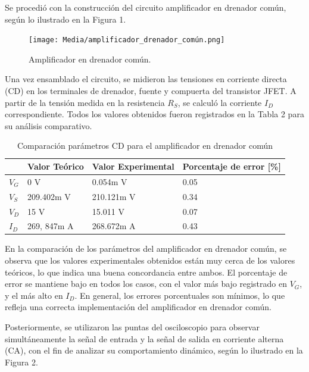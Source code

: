 \documentclass[journal]{IEEEtran}
\begin{document}
	\par Se procedió con la construcción del circuito amplificador en drenador común, según lo ilustrado en la Figura 1. 
	\begin{figure}[H]
		\centering
		\texttt{[image: Media/amplificador\_drenador\_común.png]}
		\caption{Amplificador en drenador común.}
		\label{fig:amplificador_drenador_común.}
	\end{figure}
	\par Una vez ensamblado el circuito, se midieron las tensiones en corriente directa (CD) en los terminales de drenador, fuente y compuerta del transistor JFET. A partir de la tensión medida en la resistencia \( R_S \), se calculó la corriente \( I_D \) correspondiente. Todos los valores obtenidos fueron registrados en la Tabla 2 para su análisis comparativo.
	\begin{table}[h]
		\caption{Comparación parámetros CD para el amplificador en drenador común}
		\centering
		\renewcommand{\arraystretch}{1.2} %
		\begin{tabular}{|l|p{2cm}|p{2cm}|p{2cm}|}
			\hline
			& \textbf{Valor Teórico} & \textbf{Valor Experimental} & \textbf{Porcentaje de error [\%]} \\
			\hline
			\( V_G \) & 0 V  & 0.054m V  & 0.05 \\
			\hline
			\( V_S \) & 209.402m V   & 210.121m V  & 0.34 \\
			\hline
			\( V_D \) & 15 V & 15.011 V & 0.07 \\
			\hline
			\( I_D \) & 269, 847m A & 268.672m A & 0.43 \\
			\hline
		\end{tabular}
		\label{tab:resistencias}
	\end{table}
	\par En la comparación de los parámetros del amplificador en drenador común, se observa que los valores experimentales obtenidos están muy cerca de los valores teóricos, lo que indica una buena concordancia entre ambos. El porcentaje de error se mantiene bajo en todos los casos, con el valor más bajo registrado en \( V_G \), y el más alto en \( I_D \). En general, los errores porcentuales son mínimos, lo que refleja una correcta implementación del amplificador en drenador común.
	\par Posteriormente, se utilizaron las puntas del osciloscopio para observar simultáneamente la señal de entrada y la señal de salida en corriente alterna (CA), con el fin de analizar su comportamiento dinámico, según lo ilustrado en la Figura 2. 
\end{document}
